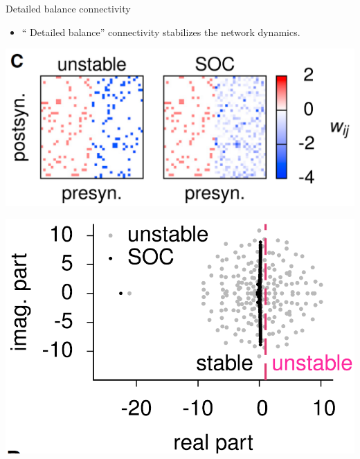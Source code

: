 \documentclass[fleqn]{beamer}
\newcommand{\curldoquom}[1]{\textquotedblleft
#1\textquotedblright\hspace{.01mm}}
\newcommand{\ppc}[1]{\pause\setcounter{page}{#1}}
\begin{document}
\begin{frame}{Detailed balance connectivity}
 \begin{itemize}
  \item \curldoquom{Detailed balance} connectivity stabilizes the network
dynamics.
 \end{itemize}\ppc{16}
 \vspace*{1cm}
 \begin{minipage}{.48\linewidth}
 \begin{center}
  \includegraphics[width=\textwidth]{figures/hennequin1}
  \begin{flushright}
  {\footnotesize \cite{Hennequin2014}}
\end{flushright}
\end{center}
\end{minipage}\ppc{16}
\begin{minipage}{.48\linewidth}
 \begin{center}
  \includegraphics[width=.8\textwidth]{figures/hennequin2}
\end{center}
\end{minipage}
\end{frame}
\end{document}
